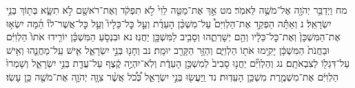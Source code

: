 \documentclass[twoside, openany, parskip=half, 11pt]{book}
\begin{document}
מח וַיְדַבֵּ֥ר יְהֹוָ֖ה אֶל־מֹשֶׁ֥ה לֵּאמֹֽר׃ מט אַ֣ךְ אֶת־מַטֵּ֤ה לֵוִי֙ לֹ֣א תִפְקֹ֔ד וְאֶת־רֹאשָׁ֖ם לֹ֣א תִשָּׂ֑א בְּת֖וֹךְ בְּנֵ֥י יִשְׂרָאֵֽל׃ נ וְאַתָּ֡ה הַפְקֵ֣ד אֶת־הַלְוִיִּם֩ עַל־מִשְׁכַּ֨ן הָעֵדֻ֜ת וְעַ֣ל כׇּל־כֵּלָיו֮ וְעַ֣ל כׇּל־אֲשֶׁר־לוֹ֒ הֵ֜מָּה יִשְׂא֤וּ אֶת־הַמִּשְׁכָּן֙ וְאֶת־כׇּל־כֵּלָ֔יו וְהֵ֖ם יְשָׁרְתֻ֑הוּ וְסָבִ֥יב לַמִּשְׁכָּ֖ן יַחֲנֽוּ׃ נא וּבִנְסֹ֣עַ הַמִּשְׁכָּ֗ן יוֹרִ֤ידוּ אֹתוֹ֙ הַלְוִיִּ֔ם וּבַחֲנֹת֙ הַמִּשְׁכָּ֔ן יָקִ֥ימוּ אֹת֖וֹ הַלְוִיִּ֑ם וְהַזָּ֥ר הַקָּרֵ֖ב יוּמָֽת׃ נב וְחָנ֖וּ בְּנֵ֣י יִשְׂרָאֵ֑ל אִ֧ישׁ עַֽל־מַחֲנֵ֛הוּ וְאִ֥ישׁ עַל־דִּגְל֖וֹ לְצִבְאֹתָֽם׃ נג וְהַלְוִיִּ֞ם יַחֲנ֤וּ סָבִיב֙ לְמִשְׁכַּ֣ן הָעֵדֻ֔ת וְלֹֽא־יִהְיֶ֣ה קֶ֔צֶף עַל־עֲדַ֖ת בְּנֵ֣י יִשְׂרָאֵ֑ל וְשָׁמְרוּ֙ הַלְוִיִּ֔ם אֶת־מִשְׁמֶ֖רֶת מִשְׁכַּ֥ן הָעֵדֽוּת׃ נד וַֽיַּעֲשׂ֖וּ בְּנֵ֣י יִשְׂרָאֵ֑ל כְּ֠כֹ֠ל אֲשֶׁ֨ר צִוָּ֧ה יְהֹוָ֛ה אֶת־מֹשֶׁ֖ה כֵּ֥ן עָשֽׂוּ׃
\end{document}
